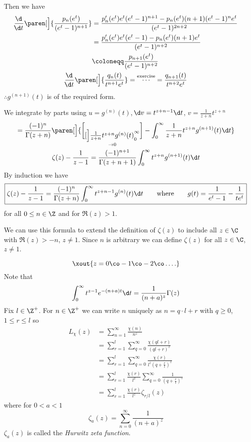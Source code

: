 Then we have
\begin{gather*}
\begin{aligned}
\frac{\!\d}{\!\d t}\paren[\Big]{\frac{p_n(e^t)}{(e^t-1)^{n+1}}} &= \frac{p'_n(e^t)e^t(e^t-1)^{n+1}-p_n(e^t)(n+1)(e^t-1)^ne^t}{(e^t-1)^{2n+2}} \\
&= \frac{p'_n(e^t)e^t(e^t-1)-p_n(e^t)(n+1)e^t}{(e^t-1)^{n+2}} \\
&\coloneqq \frac{p_{n+1}(e^t)}{(e^t-1)^{n+2}}
\end{aligned} \\
\frac{\!\d}{\!\d t}\paren[\Big]{\frac{q_n(t)}{t^{n+1}e^t}} = \overset{\text{exercise}}{\dotsb} = \frac{q_{n+1}(t)}{t^{n+2}e^t}
\end{gather*}
$\therefore g^{(n+1)}(t)$ is of the required form.

We integrate by parts using $u=g^{(n)}(t)$, $\!\d v=t^{z+n-1}\d t$, $v=\frac{1}{z+n}t^{z+n}$
\begin{gather*}
= \frac{(-1)^n}{\Gamma(z+n)}\paren[\Big]{ \underset{\to0}{\brack[\Big]{\frac{1}{z+n}t^{z+n}g^{(n)}(t)}_0^\infty} - \int_0^\infty \frac{1}{z+n} t^{z+n} g^{(n+1)}(t) \d t  } \\
\zeta(z) - \frac{1}{z-1} = \frac{(-1)^{n+1}}{\Gamma(z+n+1)}\int_0^\infty t^{z+n} g^{(n+1)}(t)\d t
\end{gather*}
By induction we have %
\[ \boxed{ \zeta(z) - \frac{1}{z-1} = \frac{(-1)^n}{\Gamma(z+n)}\int_0^\infty t^{z+n-1} g^{(n)}(t)\d t \qquad \text{where} \qquad g(t)=\frac{1}{e^t-1}-\frac{1}{te^t} } \] %
for all $0\leq n\in\Z$ and for $\Re(z)>1$.

We can use this formula to extend the definition of $\zeta(z)$ to include all $z\in\C$ with $\Re(z)>-n$, $z\neq1$.  Since $n$ is arbitrary we can define $\zeta(z)$ for all $z\in\C$, $z\neq1$.

\[ \xout{z = 0 \co -1 \co -2 \co \ldots .} \]
\ex Note that \[ \int_0^\infty t^{z-1} e^{-(n+a)t}\d t = \frac{1}{(n+a)^z} \Gamma(z) \]
Fix $l\in\Z^+$.  For $n\in\Z^+$ we can write $n$ uniquely as $n=q\cdot l+r$ with $q\geq0$, $1\leq r\leq l$ so
\begin{align*}
L_\chi(z) &= \sum_{n=1}^\infty \frac{\chi(n)}{n^z} \\
&= \sum_{r=1}^l \sum_{q=0}^\infty \frac{\chi(ql+r)}{(ql+r)^z} \\
&= \sum_{r=1}^l \sum_{q=0}^\infty \frac{\chi(r)}{l^z(q+\frac rl)^z} \\
&= \sum_{r=1}^l \frac{\chi(r)}{l^2} \sum_{q=0}^\infty \frac{1}{(q+\frac rl)^z} \\
&= \sum_{r=1}^l \frac{\chi(r)}{l^z} \zeta_{r/l}(z)
\end{align*}
where for $0<a<1$
\[ \zeta_a(z) = \sum_{n=0}^\infty \frac{1}{(n+a)^z} \]
$\zeta_a(z)$ is called the \emph{Hurwitz zeta function}.

